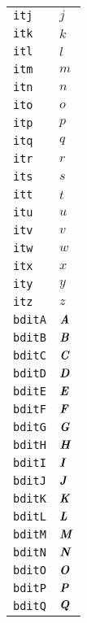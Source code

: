 \begin{longtable}{ll}
\texttt{itj}&${}\textit{j}{}$\\
\texttt{itk}&${}\textit{k}{}$\\
\texttt{itl}&${}\textit{l}{}$\\
\texttt{itm}&${}\textit{m}{}$\\
\texttt{itn}&${}\textit{n}{}$\\
\texttt{ito}&${}\textit{o}{}$\\
\texttt{itp}&${}\textit{p}{}$\\
\texttt{itq}&${}\textit{q}{}$\\
\texttt{itr}&${}\textit{r}{}$\\
\texttt{its}&${}\textit{s}{}$\\
\texttt{itt}&${}\textit{t}{}$\\
\texttt{itu}&${}\textit{u}{}$\\
\texttt{itv}&${}\textit{v}{}$\\
\texttt{itw}&${}\textit{w}{}$\\
\texttt{itx}&${}\textit{x}{}$\\
\texttt{ity}&${}\textit{y}{}$\\
\texttt{itz}&${}\textit{z}{}$\\
\texttt{bditA}&${}\textbf{\textit{A}}{}$\\
\texttt{bditB}&${}\textbf{\textit{B}}{}$\\
\texttt{bditC}&${}\textbf{\textit{C}}{}$\\
\texttt{bditD}&${}\textbf{\textit{D}}{}$\\
\texttt{bditE}&${}\textbf{\textit{E}}{}$\\
\texttt{bditF}&${}\textbf{\textit{F}}{}$\\
\texttt{bditG}&${}\textbf{\textit{G}}{}$\\
\texttt{bditH}&${}\textbf{\textit{H}}{}$\\
\texttt{bditI}&${}\textbf{\textit{I}}{}$\\
\texttt{bditJ}&${}\textbf{\textit{J}}{}$\\
\texttt{bditK}&${}\textbf{\textit{K}}{}$\\
\texttt{bditL}&${}\textbf{\textit{L}}{}$\\
\texttt{bditM}&${}\textbf{\textit{M}}{}$\\
\texttt{bditN}&${}\textbf{\textit{N}}{}$\\
\texttt{bditO}&${}\textbf{\textit{O}}{}$\\
\texttt{bditP}&${}\textbf{\textit{P}}{}$\\
\texttt{bditQ}&${}\textbf{\textit{Q}}{}$\\

\end{longtable}
